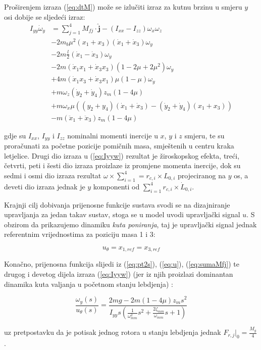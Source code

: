 \documentclass[11pt,a4paper]{article}
\begin{document}
Proširenjem izraza (\ref{eq:dtM}) može se izlučiti izraz za kutnu brzinu u smjeru $y$ osi dobije se sljedeći izraz:
\begin{equation}
\begin{split}
I_{yy}\dot{\omega}_{y}  & = \sum_{j=1}^{4}M_{fj}\cdot  \bm{\hat{j}} - (I_{xx} - I_{zz})\omega_{x}\omega_{z} \\
&- 2m_{b}\mu^{2}(x_{1} + x_{3})(\dot{x}_{1} + \dot{x}_{3} )\omega_{y} \\
&- 2m\frac{l}{2}(\dot{x}_{1} - \dot{x}_{3})\omega_{y} \\
&- 2m(\dot{x}_{1}x_{1} + \dot{x}_{3}x_{3})(1-2\mu + 2\mu^{2})\omega_{y} \\
&+ 4m(\dot{x}_{1}x_{3} + \dot{x}_{3}x_{1})\mu(1-\mu)\omega_{y} \\
&+ m \omega_{z}(\dot{y}_{2} + \dot{y}_{4})z_{m}(1-4\mu) \\
&+ m\omega_{x}\mu ((y_{2} + y_{4})(\dot{x}_{1} + \dot{x}_{3})-(\dot{y}_{2} + \dot{y}_{4})(x_{1} + x_{3})) \\
&- m(\ddot{x}_{1} + \ddot{x}_{3})z_{m}(1 - 4\mu)
\end{split}
\label{eq:Iyyw}
\end{equation}

gdje su $I_{xx}$, $I_{yy}$ i $I_{zz}$ nominalni momenti inercije u $x$, $y$ i $z$ smjeru, te su proračunati za početne pozicije pomičnih masa, smještenih u centru kraka letjelice. Drugi dio izraza u (\ref{eq:Iyyw}) rezultat je žiroskopskog efekta, treći, četvrti, peti i šesti dio izraza proizlaze iz promjene momenta inercije, dok su sedmi i osmi dio izraza rezultat $\omega \times \sum_{i=1}^{4} = r_{c,i}\times L_{0,i}$ projeciranog na $y$ os, a deveti dio izraza jednak je $y$ komponenti od $\sum_{i=1}^{4}r_{c,i}\times \dot{L}_{0,i}$.  

\medskip

Krajnji cilj dobivanja prijenosne funkcije sustava svodi se na dizajniranje upravljanja za jedan takav sustav, stoga se u model uvodi upravljački signal $u$. S obzirom da prikazujemo dinamiku \textit{kuta poniranja}, taj je upravljački signal jednak referentnim vrijednostima za poziciju masa 1 i 3:

\begin{equation}
 u_{\theta} = x_{1, ref} = x_{3, ref}
 \label{eq:u}
 \end{equation} 

Konačno, prijenosna funkcija slijedi iz (\ref{eq:pt2s}), (\ref{eq:u}), (\ref{eq:sumaMfj}) te drugog i devetog dijela izraza (\ref{eq:Iyyw}) (jer iz njih proizlazi dominantan dinamika kuta valjanja u početnom stanju lebdjenja) \cite{haus2} \cite{haus3}:

\begin{equation}
\boxed{
\frac{\omega_{y}(s)}{u_{\theta}(s)} = \frac{2mg - 2m(1-4\mu)z_{m}s^{2}}{I_{yy}s \left(\frac{1}{\omega_{mm}^{2}}s^{2} + \frac{2\zeta_{mm}}{\omega_{mm}}s + 1  \right)}
}
\label{eq:tf}
\end{equation}

uz pretpostavku da je potisak jednog rotora u stanju lebdjenja jednak $F_{r,j}|_{0} = \frac{M_{g}}{4}$.
\end{document}
